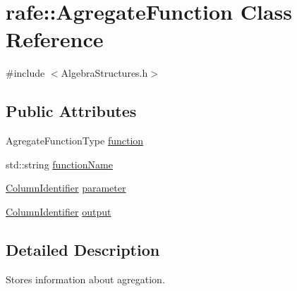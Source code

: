 \hypertarget{classrafe_1_1_agregate_function}{\section{rafe\+:\+:Agregate\+Function Class Reference}
\label{classrafe_1_1_agregate_function}
}


{\ttfamily \#include $<$Algebra\+Structures.\+h$>$}

\subsection*{Public Attributes}
\begin{DoxyCompactItemize}
\item 
Agregate\+Function\+Type \hyperlink{classrafe_1_1_agregate_function_a9055ffba2605e99d0ca5362b9b5c7437}{function}
\item 
std\+::string \hyperlink{classrafe_1_1_agregate_function_a0b3dc806bca42c5ce5525441025166f0}{function\+Name}
\item 
\hyperlink{classrafe_1_1_column_identifier}{Column\+Identifier} \hyperlink{classrafe_1_1_agregate_function_ab7cc5507a807035e2a35fbba2fc650d6}{parameter}
\item 
\hyperlink{classrafe_1_1_column_identifier}{Column\+Identifier} \hyperlink{classrafe_1_1_agregate_function_ad01da78516417600b5fa40418a5d2cb6}{output}
\end{DoxyCompactItemize}


\subsection{Detailed Description}
Stores information about agregation. 

